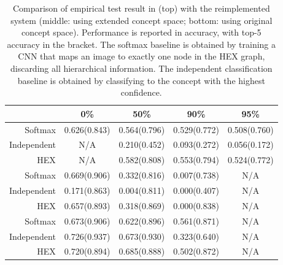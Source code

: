 \documentclass[11pt,a4paper]{article}
\begin{document}
\begin{table}[htbp]
\centering
\begin{tabular}{r|c|c|c|c}
 & 0\% & 50\% & 90\% & 95\%\\
\hline
Softmax     & 0.626(0.843) & 0.564(0.796) & 0.529(0.772) & 0.508(0.760)\\
Independent & N/A          & 0.210(0.452) & 0.093(0.272) & 0.056(0.172)\\
HEX         & N/A          & 0.582(0.808) & 0.553(0.794) & 0.524(0.772)\\
\hline
Softmax     & 0.669(0.906) & 0.332(0.816) & 0.007(0.738) & N/A\\
Independent & 0.171(0.863) & 0.004(0.811) & 0.000(0.407) & N/A\\
HEX         & 0.657(0.893) & 0.318(0.869) & 0.000(0.838) & N/A\\
\hline
Softmax     & 0.673(0.906) & 0.622(0.896) & 0.561(0.871) & N/A\\
Independent & 0.726(0.937) & 0.673(0.930) & 0.323(0.640) & N/A\\
HEX         & 0.720(0.894) & 0.685(0.888) & 0.502(0.872) & N/A
\end{tabular}
\caption{Comparison of empirical test result in \cite{deng2014large} (top) with the reimplemented system (middle: using extended concept space; bottom: using original concept space). Performance is reported in accuracy, with top-5 accuracy in the bracket. The softmax baseline is obtained by training a CNN that maps an image to exactly one node in the HEX graph, discarding all hierarchical information. The independent classification baseline is obtained by classifying to the concept with the highest confidence.}
\label{tab:original}
\end{table}
\end{document}
